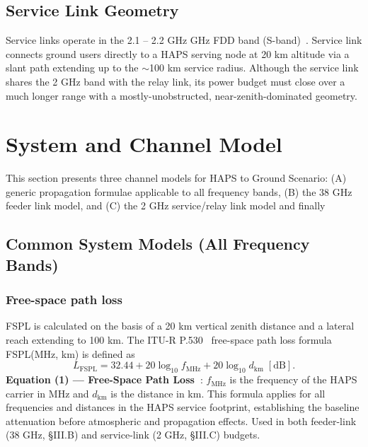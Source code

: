 \documentclass[conference]{IEEEtran}
\begin{document}
\subsection{Service Link Geometry}

Service links operate in the 2.1 -- 2.2 GHz  GHz FDD band (S-band)~\cite{3gpp_ts38821}. Service link connects 
ground users directly to a HAPS serving node at 20 km altitude via a slant path extending up to the $\sim$100 km 
service radius. Although the service link shares the 2 GHz band with the relay link, its power budget
 must close over a much longer range with a mostly-unobstructed, near-zenith-dominated geometry.

\section{System and Channel Model}

This section presents three channel models for HAPS to Ground Scenario: (A) generic propagation formulae applicable to all frequency bands, (B) the 38 GHz feeder link model, and (C) the 2 GHz service/relay link model and finally

\subsection{Common System Models (All Frequency Bands)}

\subsubsection{Free-space path loss}
FSPL is calculated on the basis of a 20 km vertical zenith distance and a lateral reach extending to 100 km.
The ITU-R P.530~\cite{itu_p530} free-space path loss formula FSPL(MHz, km) is defined as
\begin{equation}
L_\mathrm{FSPL} = 32.44 + 20\log_{10} f_\mathrm{MHz} + 20\log_{10} d_\mathrm{km} \;[\mathrm{dB}].
\label{eq:fspl}
\end{equation}
\noindent\textbf{Equation (1) --- Free-Space Path Loss~\cite{itu_p530}}: $f_\mathrm{MHz}$ is the frequency of the HAPS carrier in MHz and $d_\mathrm{km}$ is the distance in km. This formula applies for all frequencies and distances in the HAPS service footprint, establishing the baseline attenuation before atmospheric and propagation effects. Used in both feeder-link (38 GHz, §III.B) and service-link (2 GHz, §III.C) budgets.
\end{document}
